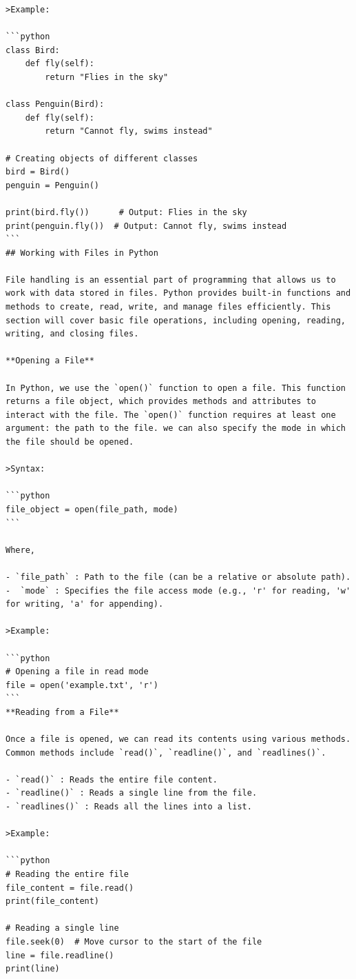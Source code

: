 \documentclass[
  letterpaper,
  DIV=11,
  numbers=noendperiod]{scrreprt}
\theoremstyle{plain}
\theoremstyle{definition}
\theoremstyle{remark}
\begin{document}
\begin{verbatim}
>Example:

```python
class Bird:
    def fly(self):
        return "Flies in the sky"

class Penguin(Bird):
    def fly(self):
        return "Cannot fly, swims instead"

# Creating objects of different classes
bird = Bird()
penguin = Penguin()

print(bird.fly())      # Output: Flies in the sky
print(penguin.fly())  # Output: Cannot fly, swims instead
```
## Working with Files in Python

File handling is an essential part of programming that allows us to work with data stored in files. Python provides built-in functions and methods to create, read, write, and manage files efficiently. This section will cover basic file operations, including opening, reading, writing, and closing files.

**Opening a File**

In Python, we use the `open()` function to open a file. This function returns a file object, which provides methods and attributes to interact with the file. The `open()` function requires at least one argument: the path to the file. we can also specify the mode in which the file should be opened.

>Syntax:

```python
file_object = open(file_path, mode)
```

Where,

- `file_path` : Path to the file (can be a relative or absolute path).
-  `mode` : Specifies the file access mode (e.g., 'r' for reading, 'w' for writing, 'a' for appending).

>Example:

```python
# Opening a file in read mode
file = open('example.txt', 'r')
```
**Reading from a File**

Once a file is opened, we can read its contents using various methods. Common methods include `read()`, `readline()`, and `readlines()`.

- `read()` : Reads the entire file content.
- `readline()` : Reads a single line from the file.
- `readlines()` : Reads all the lines into a list.

>Example:

```python
# Reading the entire file
file_content = file.read()
print(file_content)

# Reading a single line
file.seek(0)  # Move cursor to the start of the file
line = file.readline()
print(line)


\end{verbatim}
\end{document}
